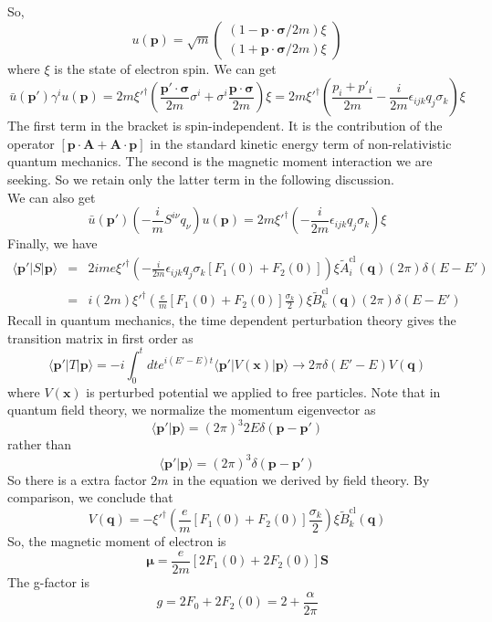 \documentclass[cyan]{elegantnote}
\begin{document}
So, 
\[u(\bm{p}) = \sqrt{m}  \begin{pmatrix}(1 - \bm{p}\cdot\bm{\sigma}/2m)\xi\\(1 + \bm{p}\cdot\bm{\sigma}/2m)\xi\end{pmatrix} \]
where $\xi$ is the state of electron spin. We can get
\[\bar{u}(\bm{p}') \gamma^i u(\bm{p}) = 2m \xi'^{\dagger} \left( \frac{\bm{p}'\cdot\bm{\sigma}}{2m}\sigma^i + \sigma^i\frac{\bm{p}\cdot\bm{\sigma}}{2m} \right) \xi = 2m \xi'^{\dagger} \left( \frac{p_i + p'_i}{2m} -\frac{i}{2m}\epsilon_{ijk}q_j\sigma_k \right) \xi\]
The first term in the bracket is spin-independent. It is the contribution of the operator $[\bm{p}\cdot\bm{A} + \bm{A}\cdot\bm{p}]$ in the standard kinetic energy term of non-relativistic quantum mechanics. 
The second is the magnetic moment interaction we are seeking. So we retain only the latter term in the following discussion. \\
We can also get
\[\bar{u}(\bm{p}') \left( - \frac{i}{m}S^{i\nu}q_{\nu} \right) u(\bm{p}) = 2m \xi'^{\dagger} \left( -\frac{i}{2m}\epsilon_{ijk}q_j\sigma_k \right) \xi\]
Finally, we have
\begin{eqnarray}
\langle \bm{p}' | S | \bm{p} \rangle &=& 2ime \xi'^{\dagger} \left( -\frac{i}{2m}\epsilon_{ijk}q_j\sigma_k[F_1(0) + F_2(0)] \right) \xi \tilde{A}_{i}^{\mathrm{cl}}(\bm{q})(2\pi)\delta(E-E') \nonumber \\
&=& i(2m)\xi'^{\dagger} \left( \frac{e}{m}[F_1(0) + F_2(0)] \frac{\sigma_k}{2}\right) \xi \tilde{B}_{k}^{\mathrm{cl}}(\bm{q})(2\pi)\delta(E-E') \nonumber
\end{eqnarray}
Recall in quantum mechanics, the time dependent perturbation theory gives the transition matrix in first order as
\[\langle \bm{p}' | T | \bm{p} \rangle = -i\int_0^t dt e^{i(E'-E)t} \langle \bm{p}' | V(\bm{x}) | \bm{p} \rangle \to 2\pi\delta(E'-E)V(\bm{q})\]
where $V(\bm{x})$ is perturbed potential we applied to free particles. Note that in quantum field theory, we normalize the momentum eigenvector as
\[\langle \bm{p}' | \bm{p} \rangle = (2\pi)^3 2E \delta(\bm{p}-\bm{p}')  \]
rather than
\[\langle \bm{p}' | \bm{p} \rangle = (2\pi)^3 \delta(\bm{p}-\bm{p}')  \]
So there is a extra factor $2m$ in the equation we derived by field theory. By comparison, we conclude that
\[V(\bm{q}) = -\xi'^{\dagger} \left( \frac{e}{m}[F_1(0) + F_2(0)] \frac{\sigma_k}{2}\right) \xi \tilde{B}_{k}^{\mathrm{cl}}(\bm{q})\]
So, the magnetic moment of electron is
\[\bm{\mu} = \frac{e}{2m}[2F_1(0) + 2F_2(0)]\bm{S}\]
The g-factor is
\[g = 2F_0 + 2F_2(0) = 2 + \frac{\alpha}{2\pi}\]
\end{document}
